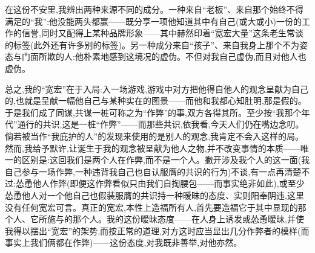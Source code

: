 在这份不安里,我辨出两种来源不同的成分。一种来自“老板”、来自那个始终不得满足的“我”:他没能两头都赢——既分享一项他知道其中有自己(或大或小)一份的工作的信誉,同时又配得上某种品牌形象——其中赫然印着“宽宏大量”这条老生常谈的标签(此外还有许多别的标签)。另一种成分来自“孩子”、来自我身上那个不为姿态与门面所欺的人:他朴素地感到这境况的虚伪。不但对我自己虚伪,而且\dmark{}对他人也虚伪。

总之,我的“宽宏”在于入局:入一场游戏,游戏中对方把他得自他人的观念呈献为自己的,也就是呈献一幅他自己与某种实在的图景——而他和我都心知肚明,那是假的。于是我们成了同谋,共谋一桩可称之为“作弊”的事,双方各得其所。至少按“我那个年代”通行的共识,这是一桩“作弊”——而那些共识,依我看,今天人们仍在嘴边念叨。倘若被当作“我庇护的人”的发现来使用的是别人的观念,我肯定不会入这样的局。然而,我给予默许,让诞生于我的观念被呈献为他人之物,并不改变事情的本质——唯一的区别是:这回我们是两个人在作弊,而不是一个人。撇开涉及我个人的这一面(我自己参与一场作弊,一种违背我自己也自认服膺的共识的行为)不谈,有一点再清楚不过:怂恿他人作弊(即便这作弊看似只由我们自掏腰包——而事实绝非如此),或至少怂恿他人对一个他自己也假装服膺的共识持一种暧昧的态度、实则阳奉阴违,这里没有任何宽宏可言。真正的宽宏,本性上造福所有人,首先要造福它于其中显现的那个人、它所施与的那个人。我的这份暧昧态度——在人身上诱发或怂恿暧昧,并使我得以摆出“宽宏”的架势,而按正常的道理,对方这时应当显出几分作弊者的模样(而事实上我们俩都在作弊)——这份态度,对我既非善举,对他亦然。

